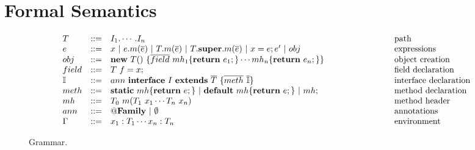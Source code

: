 \section{Formal Semantics}\label{sec:formalization}

\begin{figure*}[t]
\[\begin{array}{llll}
T & ::= & I_1.\cdots.I_n                                                                                                         & \hspace{1in} \textrm{path} \\
e & ::= & x \Or e.m(\overline{e}) \Or T.m(\overline{e}) \Or T.\mathbf{super}.m(\overline{e}) \Or x = e;e' \Or obj         & \hspace{1in} \textrm{expressions} \\
obj & ::= & \mathbf{new}\ T()\ \{\overline{field}\ mh_1\{\mathbf{return}\ e_1;\}\cdots mh_n\{\mathbf{return}\ e_n;\}\}& \hspace{1in} \textrm{object creation} \\
field & ::= & T\ f=x;                                                                                              & \hspace{1in}  \textrm{field declaration} \\
\mathbb{I} & ::= & ann\ \mathbf{interface}\ I\ \mathbf{extends}\ \overline{T}\ \{\overline{meth}\ \overline{\mathbb{I}}\}& \hspace{1in} \textrm{interface declaration} \\
meth & ::= & \mathbf{static}\ mh\{\mathbf{return}\ e;\} \Or \mathbf{default}\ mh\{\mathbf{return}\ e;\} \Or mh; & \hspace{1in} \textrm{method declaration} \\
mh & ::= & T_0\ m(T_1\ x_1\cdots T_n\ x_n)  & \hspace{1in} \textrm{method header} \\
ann & ::= & \mathbf{@Family} \Or \emptyset & \hspace{1in} \textrm{annotations} \\
\Gamma & ::= & x_1:T_1\cdots x_n:T_n & \hspace{1in} \textrm{environment}
\end{array}\]
\caption{Grammar.}
\end{figure*}

